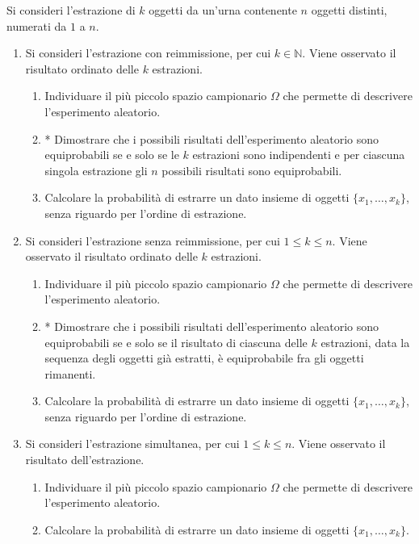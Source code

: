 Si consideri l'estrazione di $k$ oggetti da un'urna contenente $n$ oggetti distinti, numerati da $1$ a $n$.
\begin{enumerate}

	\item Si consideri l'estrazione con reimmissione, per cui $k\in \mathbb{N}$. Viene osservato il risultato ordinato delle $k$ estrazioni.
	\begin{enumerate}
		\item Individuare il più piccolo spazio campionario $\Omega $ che permette di descrivere l'esperimento aleatorio.
		\item * Dimostrare che i possibili risultati dell'esperimento aleatorio sono equiprobabili se e solo se le $k$ estrazioni sono indipendenti e per ciascuna singola estrazione gli $n$ possibili risultati sono equiprobabili.
		\item Calcolare la probabilità di estrarre un dato insieme di oggetti $\{x_{1} ,\dots ,x_{k}\}$, senza riguardo per l'ordine di estrazione.
	\end{enumerate}

	\item Si consideri l'estrazione senza reimmissione, per cui $1\leq k\leq n$. Viene osservato il risultato ordinato delle $k$ estrazioni.
	\begin{enumerate}
		\item Individuare il più piccolo spazio campionario $\Omega $ che permette di descrivere l'esperimento aleatorio.
		\item * Dimostrare che i possibili risultati dell'esperimento aleatorio sono equiprobabili se e solo se il risultato di ciascuna delle $k$ estrazioni, data la sequenza degli oggetti già estratti, è equiprobabile fra gli oggetti rimanenti.
		\item Calcolare la probabilità di estrarre un dato insieme di oggetti $\{x_{1} ,\dots ,x_{k}\}$, senza riguardo per l'ordine di estrazione.
	\end{enumerate}

	\item Si consideri l'estrazione simultanea, per cui $1\leq k\leq n$. Viene osservato il risultato dell'estrazione.
	\begin{enumerate}
		\item Individuare il più piccolo spazio campionario $\Omega $ che permette di descrivere l'esperimento aleatorio.
		\item Calcolare la probabilità di estrarre un dato insieme di oggetti $\{x_{1} ,\dots ,x_{k}\}$.
	\end{enumerate}

\end{enumerate}

